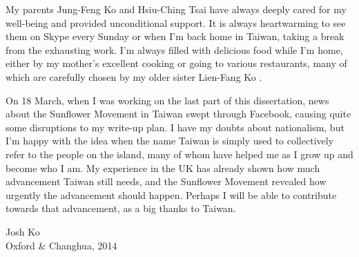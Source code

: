 \documentclass[dissertation]{subfiles}
\begin{document}
My parents Jung-Feng Ko  and Hsiu-Ching Tsai  have always deeply cared for my well-being and provided unconditional support.
It is always heartwarming to see them on Skype every Sunday or when I'm back home in Taiwan, taking a break from the exhausting work.
I'm always filled with delicious food while I'm home, either by my mother's excellent cooking or going to various restaurants, many of which are carefully chosen by my older sister Lien-Fang Ko .

On 18 March, when I was working on the last part of this dissertation, news about the Sunflower Movement in Taiwan swept through Facebook, causing quite some disruptions to my write-up plan.
I have my doubts about nationalism, but I'm happy with the idea when the name Taiwan is simply used to collectively refer to the people on the island, many of whom have helped me as I grow up and become who I am.
My experience in the UK has already shown how much advancement Taiwan still needs, and the Sunflower Movement revealed how urgently the advancement should happen.
Perhaps I will be able to contribute towards that advancement, as a big thanks to Taiwan.

\vspace*{8pt}
\hfill Josh Ko \\[-1pt]\null\hfill Oxford \& Changhua, 2014
\end{document}
